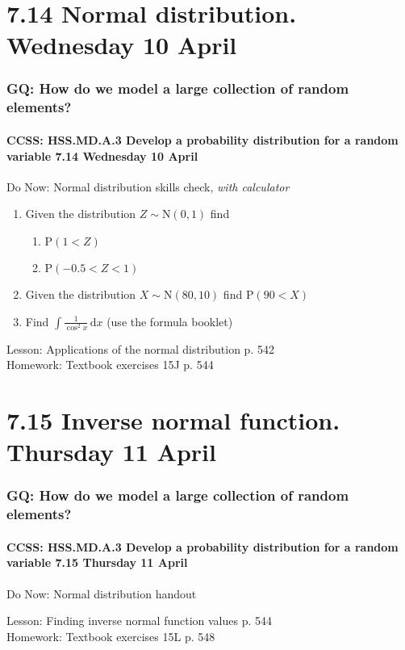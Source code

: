 \documentclass{beamer}
\begin{document}
\section{7.14 Normal distribution. Wednesday 10 April}
  \frame
  {
    \frametitle{GQ: How do we model a large collection of random elements?}
    \framesubtitle{CCSS: HSS.MD.A.3 Develop a probability distribution for a random variable \hfill \alert{7.14 Wednesday 10 April}}

    \begin{block}{Do Now: Normal distribution skills check, \emph{with calculator}}
    \begin{enumerate}
      \item Given the distribution $Z \sim \mathrm{N}(0,1)$ find
      \begin{enumerate}
        \item $\mathrm{P}(1<Z)$
        \item $\mathrm{P}(-0.5<Z<1)$
      \end{enumerate}
      \item Given the distribution $X \sim \mathrm{N}(80,10)$ find $\mathrm{P}(90<X)$
      \item Find $\displaystyle \int \frac{1}{\cos^2 x} \,\mathrm{d}x$ (use the formula booklet)
    \end{enumerate}
    \end{block}
    Lesson: Applications of the normal distribution p. 542\\
    Homework: Textbook exercises 15J p. 544
  }

\section{7.15 Inverse normal function. Thursday 11 April}
  \frame
  {
    \frametitle{GQ: How do we model a large collection of random elements?}
    \framesubtitle{CCSS: HSS.MD.A.3 Develop a probability distribution for a random variable \hfill \alert{7.15 Thursday 11 April}}

    \begin{block}{Do Now: Normal distribution handout}

    \end{block}
    Lesson: Finding inverse normal function values p. 544\\
    Homework: Textbook exercises 15L p. 548
  }
\end{document}
